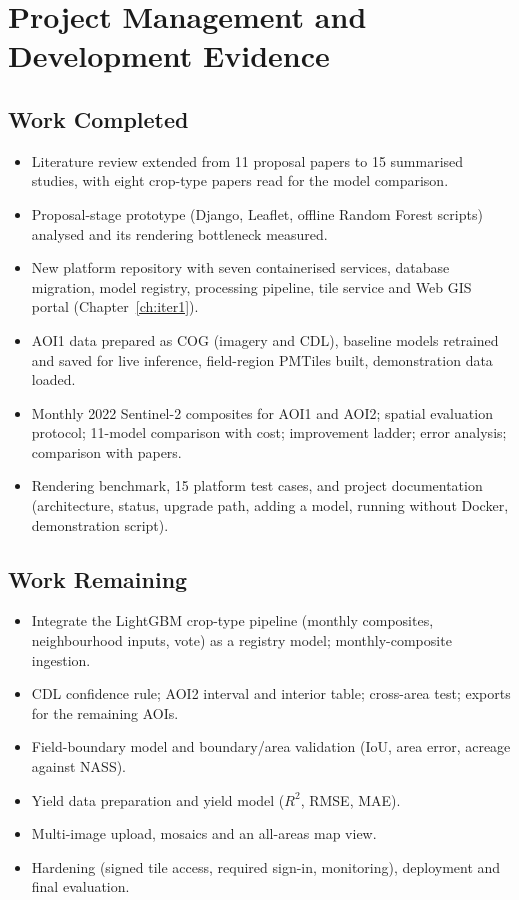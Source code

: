\chapter{Project Management and Development Evidence}

\section{Work Completed}
\begin{itemize}
  \item Literature review extended from 11 proposal papers to 15 summarised studies, with eight
        crop-type papers read for the model comparison.
  \item Proposal-stage prototype (Django, Leaflet, offline Random Forest scripts) analysed and its
        rendering bottleneck measured.
  \item New platform repository with seven containerised services, database migration, model
        registry, processing pipeline, tile service and Web GIS portal (Chapter~\ref{ch:iter1}).
  \item AOI1 data prepared as COG (imagery and CDL), baseline models retrained and saved for live
        inference, field-region PMTiles built, demonstration data loaded.
  \item Monthly 2022 Sentinel-2 composites for AOI1 and AOI2; spatial evaluation protocol; 11-model
        comparison with cost; improvement ladder; error analysis; comparison with papers.
  \item Rendering benchmark, 15 platform test cases, and project documentation (architecture,
        status, upgrade path, adding a model, running without Docker, demonstration script).
\end{itemize}

\section{Work Remaining}
\begin{itemize}
  \item Integrate the LightGBM crop-type pipeline (monthly composites, neighbourhood inputs, vote) as
        a registry model; monthly-composite ingestion.
  \item CDL confidence rule; AOI2 interval and interior table; cross-area test; exports for the
        remaining AOIs.
  \item Field-boundary model and boundary/area validation (IoU, area error, acreage against NASS).
  \item Yield data preparation and yield model ($R^2$, RMSE, MAE).
  \item Multi-image upload, mosaics and an all-areas map view.
  \item Hardening (signed tile access, required sign-in, monitoring), deployment and final evaluation.
\end{itemize}

